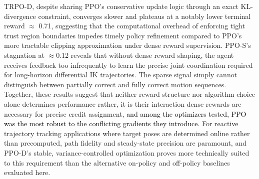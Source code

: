 \documentclass[preprint,12pt]{elsarticle}
\begin{document}

TRPO-D, despite sharing PPO's conservative update logic through an exact KL-divergence constraint, converges slower and plateaus at a notably lower terminal reward $\approx$ 0.71, suggesting that the computational overhead of enforcing tight trust region boundaries impedes timely policy refinement compared to PPO's more tractable clipping approximation under dense reward supervision. PPO-S's stagnation at $\approx$0.12 reveals that without dense reward shaping, the agent receives feedback too infrequently to learn the precise joint coordination required for long-horizon differential IK trajectories. The sparse signal simply cannot distinguish between partially correct and fully correct motion sequences. Together, these results suggest that neither reward structure nor algorithm choice alone determines performance rather, it is their interaction dense rewards are necessary for precise credit assignment, \textcolor{black}{and among the optimizers tested, PPO was the most robust to the conflicting gradients they introduce.} For reactive trajectory tracking applications where target poses are determined online rather than precomputed, path fidelity and steady-state precision are paramount, and PPO-D's stable, variance-controlled optimization proves more technically suited to this requirement than the alternative on-policy and off-policy baselines evaluated here.
\end{document}
